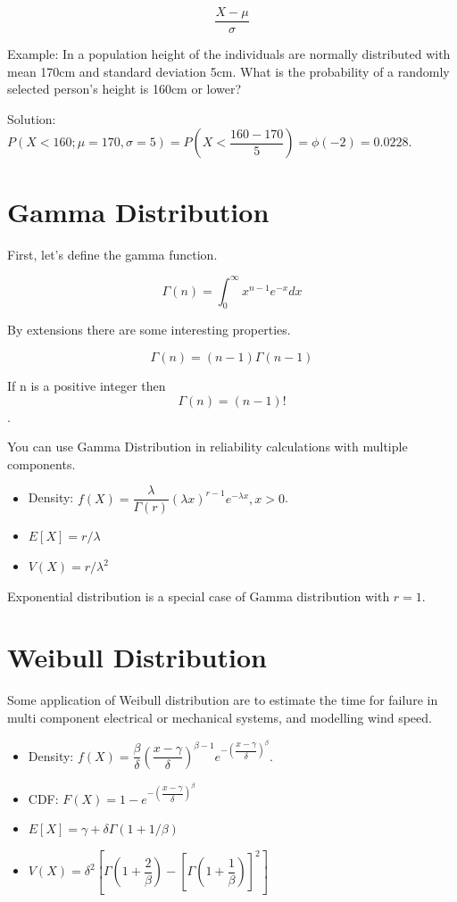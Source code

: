 \documentclass[]{book}
\theoremstyle{definition}
\theoremstyle{definition}
\theoremstyle{definition}
\theoremstyle{remark}
\begin{document}
\[\dfrac{X-\mu}{\sigma}\]

Example: In a population height of the individuals are normally
distributed with mean 170cm and standard deviation 5cm. What is the
probability of a randomly selected person's height is 160cm or lower?

Solution:
\(P(X < 160; \mu = 170, \sigma = 5) = P(X < \dfrac{160 - 170}{5}) = \phi(-2) = 0.0228\).

\hypertarget{gamma-distribution}{%
\section{Gamma Distribution}\label{gamma-distribution}}

First, let's define the gamma function.

\[\Gamma(n) = \int_0^\infty x^{n-1}e^{-x}dx\]

By extensions there are some interesting properties.

\[\Gamma(n) = (n-1)\Gamma(n-1)\]

If n is a positive integer then \[\Gamma(n) = (n-1)!\].

You can use Gamma Distribution in reliability calculations with multiple
components.

\begin{itemize}
\item
  Density:
  \(f(X) = \dfrac{\lambda}{\Gamma(r)}(\lambda x)^{r-1} e^{-\lambda x}, x > 0\).
\item
  \(E[X] = r/\lambda\)
\item
  \(V(X) = r/\lambda^2\)
\end{itemize}

Exponential distribution is a special case of Gamma distribution with
\(r=1\).

\hypertarget{weibull-distribution}{%
\section{Weibull Distribution}\label{weibull-distribution}}

Some application of Weibull distribution are to estimate the time for
failure in multi component electrical or mechanical systems, and
modelling wind speed.

\begin{itemize}
\item
  Density:
  \(f(X) = \dfrac{\beta}{\delta}\left(\dfrac{x - \gamma}{\delta}\right)^{\beta-1} e^{-\left(\dfrac{x - \gamma}{\delta}\right)^\beta}\).
\item
  CDF: \(F(X) = 1 - e^{-\left(\dfrac{x - \gamma}{\delta}\right)^\beta}\)
\item
  \(E[X] = \gamma + \delta \Gamma(1 + 1/\beta)\)
\item
  \(V(X) = \delta^2\left[\Gamma\left(1+\dfrac{2}{\beta}\right) - \left[\Gamma\left(1 + \dfrac{1}{\beta}\right)\right]^2 \right]\)
\end{itemize}
\end{document}
